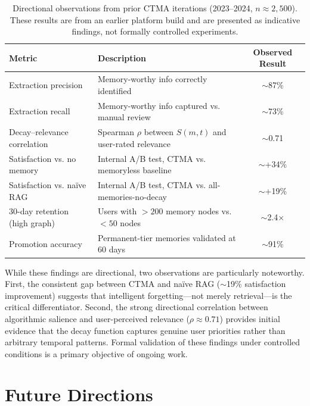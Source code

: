 \documentclass[11pt,a4paper]{article}
\begin{document}
\begin{table}[H]
\centering
\caption{Directional observations from prior CTMA iterations (2023--2024, $n \approx 2{,}500$). These results are from an earlier platform build and are presented as indicative findings, not formally controlled experiments.}
\label{tab:results}
\small
\begin{tabularx}{\textwidth}{lXc}
\toprule
\textbf{Metric} & \textbf{Description} & \textbf{Observed Result} \\
\midrule
Extraction precision & Memory-worthy info correctly identified & $\sim$87\% \\
Extraction recall & Memory-worthy info captured vs. manual review & $\sim$73\% \\
Decay--relevance correlation & Spearman $\rho$ between $S(m,t)$ and user-rated relevance & $\sim$0.71 \\
Satisfaction vs. no memory & Internal A/B test, CTMA vs. memoryless baseline & $\sim$+34\% \\
Satisfaction vs. na\"ive RAG & Internal A/B test, CTMA vs. all-memories-no-decay & $\sim$+19\% \\
30-day retention (high graph) & Users with $>200$ memory nodes vs. $<50$ nodes & $\sim$2.4$\times$ \\
Promotion accuracy & Permanent-tier memories validated at 60 days & $\sim$91\% \\
\bottomrule
\end{tabularx}
\end{table}

While these findings are directional, two observations are particularly noteworthy. First, the consistent gap between CTMA and na\"ive RAG ($\sim$19\% satisfaction improvement) suggests that intelligent forgetting---not merely retrieval---is the critical differentiator. Second, the strong directional correlation between algorithmic salience and user-perceived relevance ($\rho \approx 0.71$) provides initial evidence that the decay function captures genuine user priorities rather than arbitrary temporal patterns. Formal validation of these findings under controlled conditions is a primary objective of ongoing work.


\section{Future Directions}
\label{sec:future}
\end{document}
